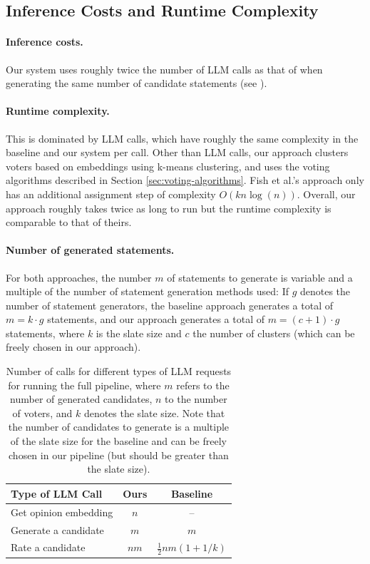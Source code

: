 \documentclass[11pt]{article}
\begin{document}
\subsection{Inference Costs and Runtime Complexity}

\paragraph{Inference costs.}
Our system uses roughly twice the number of LLM calls as that of \citet{fish-v2} when generating the same number of candidate statements (see ).

\paragraph{Runtime complexity.}
This is dominated by LLM calls, which have roughly the same complexity in the baseline and our system per call.
Other than LLM calls, our approach clusters voters based on embeddings using k-means clustering, and uses the voting algorithms described in Section \ref{sec:voting-algorithms}. Fish et al.'s approach only has an additional assignment step of complexity $O(kn \log(n))$. Overall, our approach roughly takes twice as long to run but the runtime complexity is comparable to that of theirs.

\paragraph{Number of generated statements.}
For both approaches, the number $m$ of statements to generate is variable and a multiple of the number of statement generation methods used: If $g$ denotes the number of statement generators, the baseline approach generates a total of $m=k\cdot g$ statements, and our approach generates a total of $m=(c+1) \cdot g$ statements, where $k$ is the slate size and $c$ the number of clusters (which can be freely chosen in our approach).

\begin{table}[t]
\centering
\begin{tabular}{lcc}
\hline
Type of LLM Call & Ours & Baseline \citep{fish-v2} \\
\hline
Get opinion embedding & $n$ & -- \\
Generate a candidate & $m$ & $m$ \\
Rate a candidate & $nm$ & $\frac{1}{2} n m (1 + 1/k)$ \\
\hline
\end{tabular}
\caption{Number of calls for different types of LLM requests for running the full pipeline, where $m$ refers to the number of generated candidates, $n$ to the number of voters, and $k$ denotes the slate size. Note that the number of candidates to generate is a multiple of the slate size for the baseline and can be freely chosen in our pipeline (but should be greater than the slate size).}
\label{tab:llm-call-comparison}
\end{table}
\end{document}
